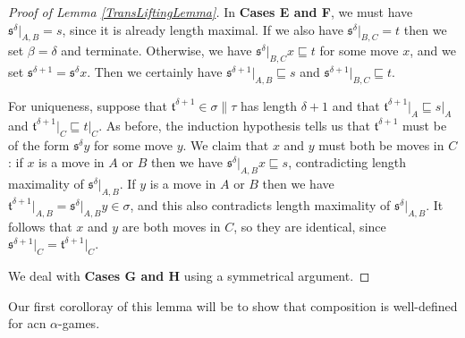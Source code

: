 \documentclass[11pt]{article} %
\theoremstyle{plain} %
\theoremstyle{definition} %
\theoremstyle{note}
\theoremstyle{exercisestyle}
\newcommand{\s}{\mathfrak s}
\renewcommand{\t}{\mathfrak t}
\newcommand{\prefix}{\sqsubseteq}
\begin{document}
\begin{proof}[Proof of Lemma \ref{TransLiftingLemma}]
  In \textbf{Cases E and F}, we must have $\s^\delta\vert_{A,B}=s$, since it is already length maximal.  If we also have $\s^\delta\vert_{B,C}=t$ then we set $\beta=\delta$ and terminate.  Otherwise, we have $\s^\delta\vert_{B,C}x\prefix t$ for some move $x$, and we set $\s^{\delta+1}=\s^\delta x$.  Then we certainly have $\s^{\delta+1}\vert_{A,B}\prefix s$ and $\s^{\delta+1}\vert_{B,C}\prefix t$.  

  For uniqueness, suppose that $\t^{\delta+1}\in\sigma\|\tau$ has length $\delta+1$ and that $\t^{\delta+1}\vert_A\prefix s\vert_A$ and $\t^{\delta+1}\vert_C\prefix t\vert_C$.  As before, the induction hypothesis tells us that $\t^{\delta+1}$ must be of the form $\s^\delta y$ for some move $y$.  We claim that $x$ and $y$ must both be moves in $C$: if $x$ is a move in $A$ or $B$ then we have $\s^\delta\vert_{A,B}x\prefix s$, contradicting length maximality of $\s^\delta\vert_{A,B}$.  If $y$ is a move in $A$ or $B$ then we have $\t^{\delta+1}\vert_{A,B}=\s^\delta\vert_{A,B}y\in\sigma$, and this also contradicts length maximality of $\s^\delta\vert_{A,B}$.  It follows that $x$ and $y$ are both moves in $C$, so they are identical, since $\s^{\delta+1}\vert_C=\t^{\delta+1}\vert_C$.

  We deal with \textbf{Cases G and H} using a symmetrical argument.
\end{proof}

Our first corolloray of this lemma will be to show that composition is well-defined for acn $\alpha$-games.
\end{document}
